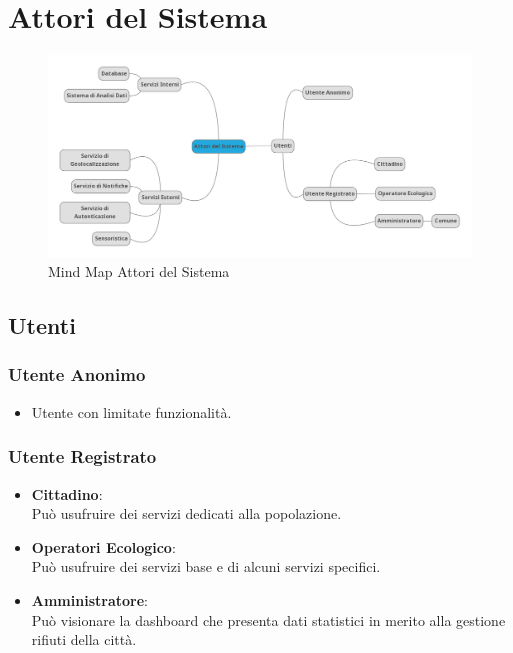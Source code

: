 \section{Attori del Sistema}
\begin{figure}[H]
    \centering
    \includegraphics[width=1\linewidth]{D1-G1//Img/MindMap.png}
    \caption{Mind Map Attori del Sistema}
    \label{fig:enter-label}
\end{figure}

\subsection{Utenti}
    \subsubsection{Utente Anonimo}
    \begin{itemize}
        \item Utente con limitate funzionalità.
    \end{itemize}
    
    \subsubsection{Utente Registrato}
    \begin{itemize}
        \item \textbf{Cittadino}: \\ Può usufruire dei servizi dedicati alla popolazione.
        \item \textbf{Operatori Ecologico}: \\ Può usufruire dei servizi base e di alcuni servizi specifici.
        \item \textbf{Amministratore}: \\ Può visionare la dashboard che presenta dati statistici in merito alla gestione rifiuti della città.
    \end{itemize}

